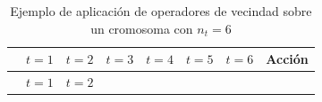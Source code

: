 \documentclass[
  spanish,
  12pt,
]{article}
\begin{document}
\begin{longtable}[]{@{}
  >{\raggedright\arraybackslash}p{}
  >{\centering\arraybackslash}p{}
  >{\centering\arraybackslash}p{}
  >{\centering\arraybackslash}p{}
  >{\centering\arraybackslash}p{}
  >{\centering\arraybackslash}p{}
  >{\centering\arraybackslash}p{}
  >{\raggedright\arraybackslash}p{}@{}}
\caption{\label{tbl:tabla_5b}Ejemplo de aplicación de operadores de
vecindad sobre un cromosoma con \(n_t = 6\)}\tabularnewline
\toprule\noalign{}
\begin{minipage}[b]{\linewidth}\raggedright
\end{minipage} & \begin{minipage}[b]{\linewidth}\centering
\(t=1\)
\end{minipage} & \begin{minipage}[b]{\linewidth}\centering
\(t=2\)
\end{minipage} & \begin{minipage}[b]{\linewidth}\centering
\(t=3\)
\end{minipage} & \begin{minipage}[b]{\linewidth}\centering
\(t=4\)
\end{minipage} & \begin{minipage}[b]{\linewidth}\centering
\(t=5\)
\end{minipage} & \begin{minipage}[b]{\linewidth}\centering
\(t=6\)
\end{minipage} & \begin{minipage}[b]{\linewidth}\raggedright
Acción
\end{minipage} \\
\midrule\noalign{}
\endfirsthead
\toprule\noalign{}
\begin{minipage}[b]{\linewidth}\raggedright
\end{minipage} & \begin{minipage}[b]{\linewidth}\centering
\(t=1\)
\end{minipage} & \begin{minipage}[b]{\linewidth}\centering
\(t=2\)
\end{minipage} & \begin{minipage}[b]{\linewidth}\centering

\end{minipage}
\end{longtable}
\end{document}

